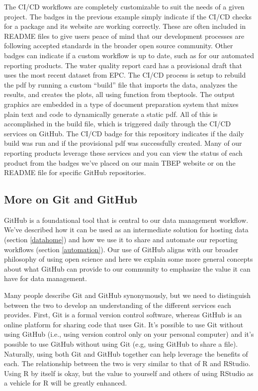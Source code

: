 \documentclass[
]{book}
\begin{document}
The CI/CD workflows are completely customizable to suit the needs of a given project. The badges in the previous example simply indicate if the CI/CD checks for a package and its website are working correctly. These are often included in README files to give users peace of mind that our development processes are following accepted standards in the broader open source community. Other badges can indicate if a custom workflow is up to date, such as for our automated reporting products. The water quality report card has a provisional draft that uses the most recent dataset from EPC. The CI/CD process is setup to rebuild the pdf by running a custom ``build'' file that imports the data, analyzes the results, and creates the plots, all using function from tbeptools. The output graphics are embedded in a type of document preparation system that mixes plain text and code to dynamically generate a static pdf. All of this is accomplished in the build file, which is triggered daily through the CI/CD services on GitHub. The CI/CD badge for this repository indicates if the daily build was run and if the provisional pdf was successfully created. Many of our reporting products leverage these services and you can view the status of each product from the badges we've placed on our main TBEP website or on the README file for specific GitHub repositories.

\hypertarget{moregit}{%
\subsection{More on Git and GitHub}\label{moregit}}

GitHub is a foundational tool that is central to our data management workflow. We've described how it can be used as an intermediate solution for hosting data (section \ref{datahome}) and how we use it to share and automate our reporting workflows (section \ref{automation}). Our use of GitHub aligns with our broader philosophy of using open science and here we explain some more general concepts about what GitHub can provide to our community to emphasize the value it can have for data management.

Many people describe Git and GitHub synonymously, but we need to distinguish between the two to develop an understanding of the different services each provides. First, Git is a formal version control software, whereas GitHub is an online platform for sharing code that uses Git. It's possible to use Git without using GitHub (i.e., using version control only on your personal computer) and it's possible to use GitHub without using Git (e.g, using GitHub to share a file). Naturally, using both Git and GitHub together can help leverage the benefits of each. The relationship between the two is very similar to that of R and RStudio. Using R by itself is okay, but the value to yourself and others of using RStudio as a vehicle for R will be greatly enhanced.
\end{document}
